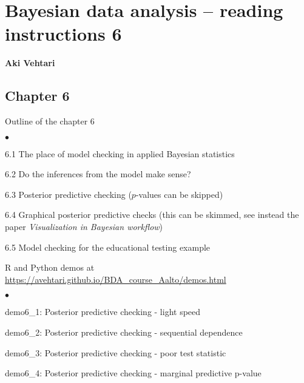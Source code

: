 \documentclass[a4paper,11pt,english]{article}
\begin{document}
\thispagestyle{empty}

\section*{Bayesian data analysis -- reading instructions 6} 
\smallskip
{\bf Aki Vehtari}
\smallskip

\subsection*{Chapter 6}

Outline of the chapter 6
\begin{list}{$\bullet$}{\parsep=0pt\itemsep=2pt}
\item 6.1 The place of model checking in applied Bayesian statistics
\item 6.2 Do the inferences from the model make sense?
\item 6.3 Posterior predictive checking {\color{gray}($p$-values can be skipped)}
\item 6.4 Graphical posterior predictive checks (this can be skimmed, see instead the paper \textit{Visualization in Bayesian workflow})
\item 6.5 Model checking for the educational testing example
\end{list}

\noindent
R and Python demos at \url{https://avehtari.github.io/BDA_course_Aalto/demos.html}
\begin{list}{$\bullet$}{\parsep=0pt\itemsep=2pt}
\item demo6\_1: Posterior predictive checking - light speed
\item demo6\_2: Posterior predictive checking - sequential dependence
\item demo6\_3: Posterior predictive checking - poor test statistic
\item demo6\_4: Posterior predictive checking - marginal predictive p-value
\end{list}
\end{document}
